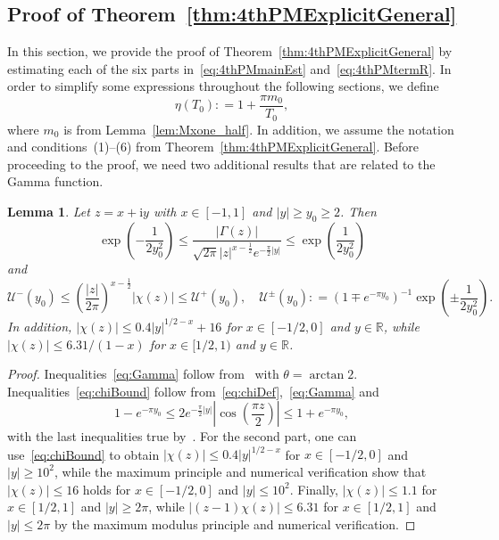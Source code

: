 \documentclass[a4paper,reqno]{amsart}
\newtheorem{lemma}[theorem]{Lemma}
\theoremstyle{definition}
\newcommand{\R}{\mathbb{R}}
\newcommand{\de}[0]{\mathrel{\mathop:}=}
\newcommand{\ie}[0]{\mathrm{i}}
\begin{document}
\subsection{Proof of Theorem~\ref{thm:4thPMExplicitGeneral}}
\label{subsec:ProofThm2}

In this section, we provide the proof of Theorem~\ref{thm:4thPMExplicitGeneral} by estimating each of the six parts in~\eqref{eq:4thPMmainEst} and~\eqref{eq:4thPMtermR}. In order to simplify some expressions throughout the following sections, we define
\[
\eta(T_0) \de 1 + \frac{\pi m_0}{T_0},
\]
where $m_0$ is from Lemma~\ref{lem:Mxone_half}. In addition, we assume the notation and conditions~(1)--(6) from Theorem~\ref{thm:4thPMExplicitGeneral}. Before proceeding to the proof, we need two additional results that are related to the Gamma function.

\begin{lemma}
\label{lem:chi}
Let $z=x+\ie y$ with $x\in[-1,1]$ and $|y|\geq y_0\geq 2$. Then
\begin{equation}
\label{eq:Gamma} 
\exp{\left(-\frac{1}{2y_0^2}\right)} \leq \frac{\left|\Gamma(z)\right|}{\sqrt{2\pi}|z|^{x-\frac{1}{2}}e^{-\frac{\pi}{2}|y|}} \leq \exp{\left(\frac{1}{2y_0^2}\right)}
\end{equation}
and
\begin{equation}
\label{eq:chiBound}
\mathcal{U}^{-}(y_0) \leq \left(\frac{|z|}{2\pi}\right)^{x-\frac{1}{2}}\left|\chi(z)\right| \leq \mathcal{U}^{+}(y_0), \quad \mathcal{U}^{\pm}(y_0)\de \left(1\mp e^{-\pi y_0}\right)^{-1}\exp{\left(\pm\frac{1}{2y_0^2}\right)}.
\end{equation}
In addition, $|\chi(z)|\leq 0.4|y|^{1/2-x}+16$ for $x\in[-1/2,0]$ and $y\in\R$, while $|\chi(z)|\leq 6.31/(1-x)$ for $x\in[1/2,1)$ and $y\in\R$.
\end{lemma}

\begin{proof}
Inequalities~\eqref{eq:Gamma} follow from~\cite[Theorem~2.1 (B2)]{DonaZunigaAlterman} with $\theta=\arctan{2}$. Inequalities~\eqref{eq:chiBound} follow from~\eqref{eq:chiDef},~\eqref{eq:Gamma} and
\[
1-e^{-\pi y_0} \leq 2e^{-\frac{\pi}{2}|y|}\left|\cos{\left(\frac{\pi z}{2}\right)}\right| \leq 1+e^{-\pi y_0},
\]
with the last inequalities true by~\cite[Proposition~2.2]{DonaZunigaAlterman}. For the second part, one can use~\eqref{eq:chiBound} to obtain $|\chi(z)|\leq 0.4|y|^{1/2-x}$ for $x\in[-1/2,0]$ and $|y|\geq 10^2$, while the maximum principle and numerical verification show that $|\chi(z)|\leq 16$ holds for $x\in[-1/2,0]$ and $|y|\leq 10^2$. Finally, $|\chi(z)|\leq 1.1$ for $x\in[1/2,1]$ and $|y|\geq 2\pi$, while $|(z-1)\chi(z)|\leq 6.31$ for $x\in[1/2,1]$ and $|y|\leq 2\pi$ by the maximum modulus principle and numerical verification.
\end{proof}
\end{document}

